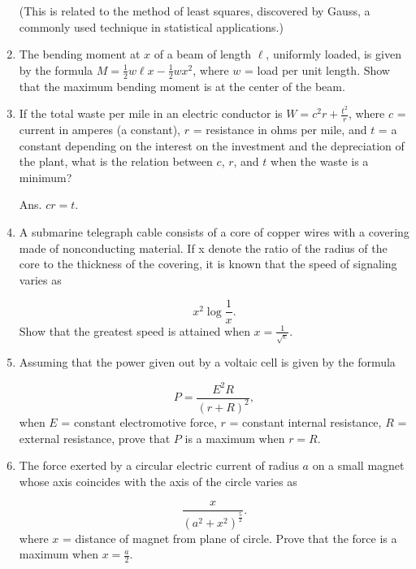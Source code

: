 \begin{enumerate}
(This is related to the method of least squares, discovered by Gauss,
a commonly used technique in statistical applications.) %

\item
The bending moment at $x$ of a beam of length $\ell$, uniformly loaded, 
is given by the formula
$  M = \frac{1}{2} w\ell x - \frac{1}{2} wx^2$,
where $w$ = load per unit length. Show that the maximum bending 
moment is at the center of the beam.

\item
 If the total waste per mile in an electric conductor is
$  W = c^2 r + \frac{t^2}{r}$, 
where $c$ = current in amperes (a constant), 
$r$ = resistance in ohms per mile, and 
$t$ = a constant depending on the interest on the investment 
and the depreciation of the plant, what is the relation 
between $c$, $r$, and $t$ when the waste is a minimum?

Ans. $cr = t$.

\item
A submarine telegraph cable consists of a core of copper wires 
with a covering made of nonconducting material. If x denote the ratio 
of the radius of the core to the thickness of the covering, it is known 
that the speed of signaling varies as

\[
    x^2 \log \frac{1}{x}.
\]
Show that the greatest speed is attained when $x = \frac{1}{\sqrt{e}}$.

\item
Assuming that the power given out by a voltaic cell is given by the formula

\[
    P = \frac{E^2 R}{(r + R)^2},
\]
when $E$ = constant electromotive force, 
$r$ = constant internal resistance, 
$R$ = external resistance, prove that $P$ is a maximum when $r = R$.

\item
The force exerted by a circular electric current of radius $a$ on a small 
magnet whose axis coincides with the axis of the circle varies as

\[
    \frac{x}{(a^2 + x^2)^{\frac{5}{2}}}.
\]
where $x$ = distance of magnet from plane of circle. Prove that the 
force is a maximum when $x = \frac{a}{2}$.


\end{enumerate}
